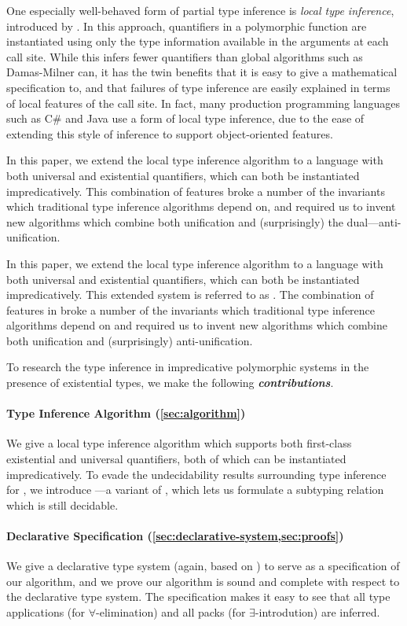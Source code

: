 One especially well-behaved form of partial type inference is \emph{local type
inference}, introduced by \citet{pierce2000:local}. In this approach,
quantifiers in a polymorphic function are instantiated using only the type
information available in the arguments at each call site. While this infers
fewer quantifiers than global algorithms such as Damas-Milner can, it has the
twin benefits that it is easy to give a mathematical specification to, and that
failures of type inference are easily explained in terms of local features of
the call site. In fact, many production programming languages such as C\# and
Java use a form of local type inference, due to the ease of extending this style
of inference to support object-oriented features. 

In this paper, we extend the local type inference algorithm to a language with
both universal and existential quantifiers, which can both be instantiated
impredicatively. This combination of features broke a number of the invariants
which traditional type inference algorithms depend on, and required us to invent
new algorithms which combine both unification and (surprisingly)
the dual---anti-unification.

In this paper, we extend the local type inference algorithm to a language with
both universal and existential quantifiers, which can both be instantiated
impredicatively. This extended system is referred to as \fexists. The
combination of features in \fexists  broke a number of the invariants which
traditional type inference algorithms depend on and required us to invent
new algorithms which combine both unification and (surprisingly)
anti-unification.

To research the type inference in impredicative polymorphic systems
in the presence of existential types, we make the following \emph{\textbf{contributions}}.

\paragraph{Type Inference Algorithm (\cref{sec:algorithm})}
    We give a local type inference algorithm
    which supports both first-class existential and universal quantifiers, both
    of which can be instantiated impredicatively. To evade the undecidability
    results surrounding type inference for \systemf, we introduce \fexists---a
    variant of \CBPV \cite{levy2006:cbpv}, which lets us formulate a subtyping
    relation which is still decidable. 

\paragraph{Declarative Specification (\cref{sec:declarative-system,sec:proofs})}
    We give a declarative type system (again, based on \CBPV) to
    serve as a specification of our algorithm, and we prove our algorithm is
    sound and complete with respect to the declarative type system. The
    specification makes it easy to see that all type applications (for
    $\forall$-elimination) and all packs (for $\exists$-introdution) are
    inferred. 

